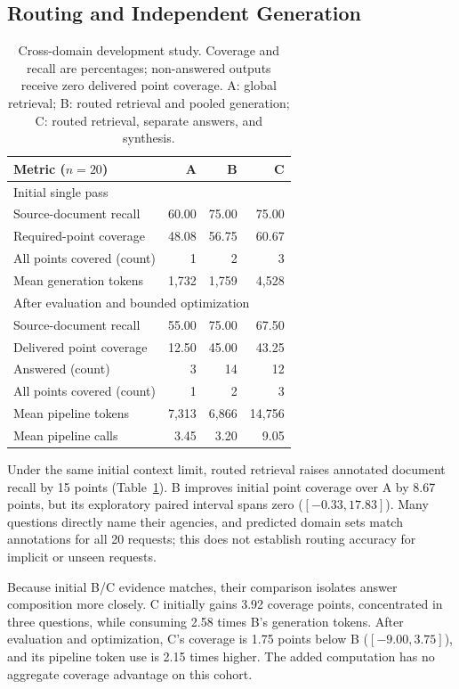 \subsection{Routing and Independent Generation}
\begin{table}[t]
\centering\small
\setlength{\tabcolsep}{4pt}
\begin{tabular}{lrrr}
\toprule
Metric ($n=20$) & A & B & C\\
\midrule
\multicolumn{4}{l}{Initial single pass}\\
Source-document recall & 60.00 & 75.00 & 75.00\\
Required-point coverage & 48.08 & 56.75 & 60.67\\
All points covered (count) & 1 & 2 & 3\\
Mean generation tokens & 1,732 & 1,759 & 4,528\\
\midrule
\multicolumn{4}{l}{After evaluation and bounded optimization}\\
Source-document recall & 55.00 & 75.00 & 67.50\\
Delivered point coverage & 12.50 & 45.00 & 43.25\\
Answered (count) & 3 & 14 & 12\\
All points covered (count) & 1 & 2 & 3\\
Mean pipeline tokens & 7,313 & 6,866 & 14,756\\
Mean pipeline calls & 3.45 & 3.20 & 9.05\\
\bottomrule
\end{tabular}
\caption{Cross-domain development study. Coverage and recall are percentages; non-answered outputs receive zero delivered point coverage. A: global retrieval; B: routed retrieval and pooled generation; C: routed retrieval, separate answers, and synthesis.}
\label{tab:crossdomain}
\end{table}

Under the same initial context limit, routed retrieval raises annotated document recall by 15 points (Table~\ref{tab:crossdomain}). B improves initial point coverage over A by 8.67 points, but its exploratory paired interval spans zero ($[-0.33,17.83]$). Many questions directly name their agencies, and predicted domain sets match annotations for all 20 requests; this does not establish routing accuracy for implicit or unseen requests.

Because initial B/C evidence matches, their comparison isolates answer composition more closely. C initially gains 3.92 coverage points, concentrated in three questions, while consuming 2.58 times B's generation tokens. After evaluation and optimization, C's coverage is 1.75 points below B ($[-9.00,3.75]$), and its pipeline token use is 2.15 times higher. The added computation has no aggregate coverage advantage on this cohort.

